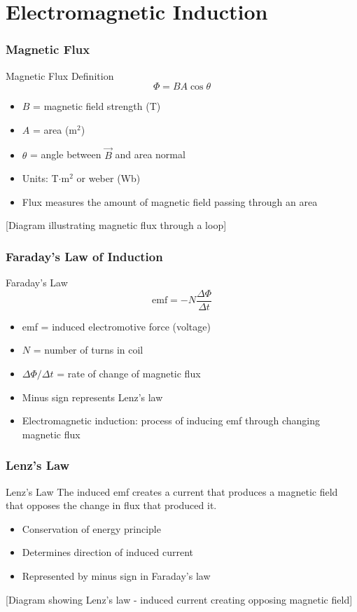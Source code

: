 \documentclass{beamer}
\begin{document}
\section{Electromagnetic Induction}

\begin{frame}
\frametitle{Magnetic Flux}
\begin{block}{Magnetic Flux Definition}
\begin{equation}
\Phi = BA\cos\theta
\end{equation}
\end{block}
\begin{itemize}
    \item $B$ = magnetic field strength (T)
    \item $A$ = area (m$^2$)
    \item $\theta$ = angle between $\vec{B}$ and area normal
    \item Units: T$\cdot$m$^2$ or weber (Wb)
    \item Flux measures the amount of magnetic field passing through an area
\end{itemize}
\alert{[Diagram illustrating magnetic flux through a loop]}
\end{frame}

\begin{frame}
\frametitle{Faraday's Law of Induction}
\begin{block}{Faraday's Law}
\begin{equation}
\text{emf} = -N\frac{\Delta\Phi}{\Delta t}
\end{equation}
\end{block}
\begin{itemize}
    \item emf = induced electromotive force (voltage)
    \item $N$ = number of turns in coil
    \item $\Delta\Phi/\Delta t$ = rate of change of magnetic flux
    \item Minus sign represents Lenz's law
    \item Electromagnetic induction: process of inducing emf through changing magnetic flux
\end{itemize}
\end{frame}

\begin{frame}
\frametitle{Lenz's Law}
\begin{block}{Lenz's Law}
The induced emf creates a current that produces a magnetic field that opposes the change in flux that produced it.
\end{block}
\begin{itemize}
    \item Conservation of energy principle
    \item Determines direction of induced current
    \item Represented by minus sign in Faraday's law
\end{itemize}
\alert{[Diagram showing Lenz's law - induced current creating opposing magnetic field]}
\end{frame}
\end{document}
